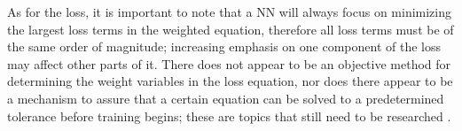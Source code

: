 \documentclass[pdflatex,sn-basic]{sn-jnl}%
\theoremstyle{thmstyleone}%
\theoremstyle{thmstyletwo}%
\theoremstyle{thmstylethree}%
\begin{document}
%
%
As for the loss, it is important to note that a NN will always focus on minimizing the largest loss terms in the weighted equation, therefore all loss terms must be of the same order of magnitude; increasing emphasis on one component of the loss may affect other parts of it.
%
There does not appear to be an objective method for determining the weight variables in the loss equation, nor does there appear to be a mechanism to assure that a certain equation can be solved to a predetermined tolerance before training begins; these are topics that still need to be researched \citep{Nan2021_ProgressTowardsSolving_HenNHN}. 



\end{document}
